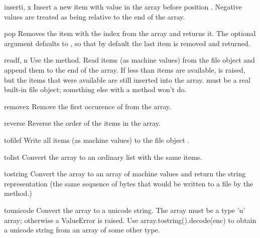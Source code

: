 \begin{methoddesc}[array]{insert}{i, x}
Insert a new item with value  in the array before position
. Negative values are treated as being relative to the end
of the array.
\end{methoddesc}

\begin{methoddesc}[array]{pop}{}
Removes the item with the index  from the array and returns
it. The optional argument defaults to , so that by default
the last item is removed and returned.
\end{methoddesc}

\begin{methoddesc}[array]{read}{f, n}
  {Use the  method.}
Read  items (as machine values) from the file object 
and append them to the end of the array.  If less than  items
are available,  is raised, but the items that were
available are still inserted into the array.   must be a real
built-in file object; something else with a  method won't
do.
\end{methoddesc}

\begin{methoddesc}[array]{remove}{x}
Remove the first occurence of  from the array.
\end{methoddesc}

\begin{methoddesc}[array]{reverse}{}
Reverse the order of the items in the array.
\end{methoddesc}

\begin{methoddesc}[array]{tofile}{f}
Write all items (as machine values) to the file object .
\end{methoddesc}

\begin{methoddesc}[array]{tolist}{}
Convert the array to an ordinary list with the same items.
\end{methoddesc}

\begin{methoddesc}[array]{tostring}{}
Convert the array to an array of machine values and return the
string representation (the same sequence of bytes that would
be written to a file by the  method.)
\end{methoddesc}

\begin{methoddesc}[array]{tounicode}{}
Convert the array to a unicode string.  The array must be
a type 'u' array; otherwise a ValueError is raised.  Use
array.tostring().decode(enc) to obtain a unicode string
from an array of some other type.
\end{methoddesc}

